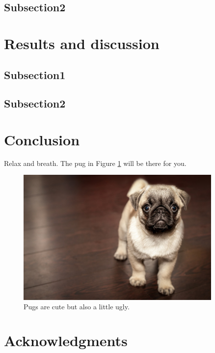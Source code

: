 \subsection{Subsection2}

\newpage
\section{Results and discussion}
\subsection{Subsection1}
\subsection{Subsection2}

\newpage
\section{Conclusion}
Relax and breath. The pug in Figure \ref{figure:1.2} will be there for you.

\begin{figure}[h]
\includegraphics[width=0.9\textwidth]{Images/pug1.jpg}
\centering
\caption{Pugs are cute but also a little ugly.}
\label{figure:1.2}
\end{figure}

\section*{Acknowledgments}
